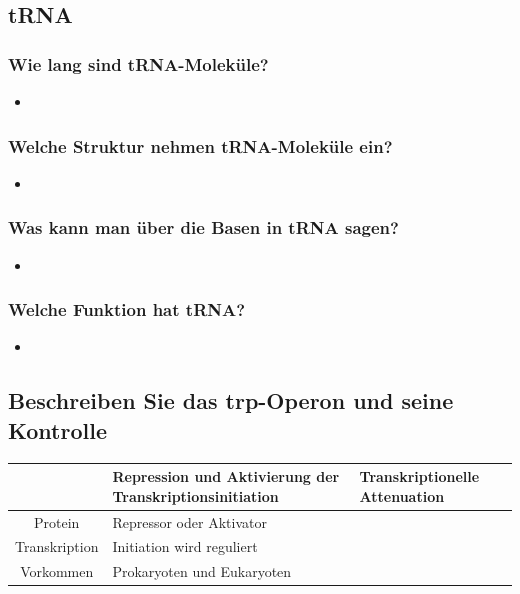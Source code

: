 \documentclass{article}
\begin{document}
\subsection*{tRNA}
\subsubsection*{Wie lang sind tRNA-Moleküle?}
\begin{itemize}     \item  \end{itemize}
\subsubsection*{Welche Struktur nehmen tRNA-Moleküle ein?}
\begin{itemize}     \item  \end{itemize}
\subsubsection*{Was kann man über die Basen in tRNA sagen?}
\begin{itemize}     \item  \end{itemize}  \bigskip

\subsubsection*{Welche Funktion hat tRNA?}
\begin{itemize}     \item  \end{itemize}
\subsection*{Beschreiben Sie das trp-Operon und seine Kontrolle}
\begin{table}[H]
    \centering
    \begin{tabular}{|c||p{5cm}|p{5cm}|} \hline
         & Repression und Aktivierung
der Transkriptionsinitiation &  Transkriptionelle
Attenuation \\ \hline \hline
        Protein & Repressor oder Aktivator &   \\ \hline 
         Transkription & Initiation wird reguliert &   \\ \hline 
        Vorkommen & Prokaryoten und Eukaryoten &  \\ \hline 
    \end{tabular}
    \label{tab:my_label}
\end{table}
\end{document}
